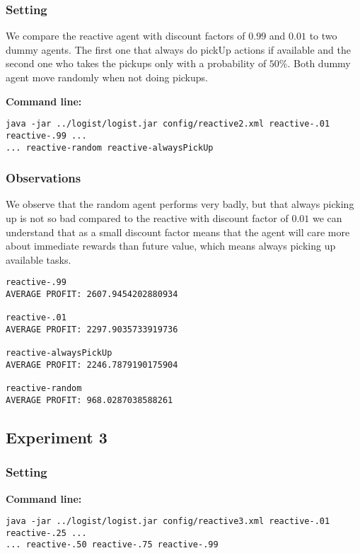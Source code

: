 \documentclass[11pt]{article}
\begin{document}
\subsubsection{Setting}
We compare the reactive agent with discount factors of $0.99$ and $0.01$ to two dummy agents. The first one that always do pickUp actions if available and the second one who takes the pickups only with a probability of $50\%$. Both dummy agent move randomly when not doing pickups.

\textbf{Command line:}
\begin{verbatim}
java -jar ../logist/logist.jar config/reactive2.xml reactive-.01 reactive-.99 ... 
... reactive-random reactive-alwaysPickUp
\end{verbatim}


\subsubsection{Observations}
We observe that the random agent performs very badly, but that always picking up is not so bad compared to the reactive with discount factor of $0.01$ we can understand  that as a small discount factor means that the agent will care more about immediate rewards than future value, which means always picking up available tasks.

\begin{verbatim}
reactive-.99
AVERAGE PROFIT: 2607.9454202880934

reactive-.01
AVERAGE PROFIT: 2297.9035733919736

reactive-alwaysPickUp
AVERAGE PROFIT: 2246.7879190175904

reactive-random
AVERAGE PROFIT: 968.0287038588261
\end{verbatim}

\subsection{Experiment 3}

\subsubsection{Setting}

\textbf{Command line:}
\begin{verbatim}
java -jar ../logist/logist.jar config/reactive3.xml reactive-.01 reactive-.25 ... 
... reactive-.50 reactive-.75 reactive-.99
\end{verbatim}
\end{document}
